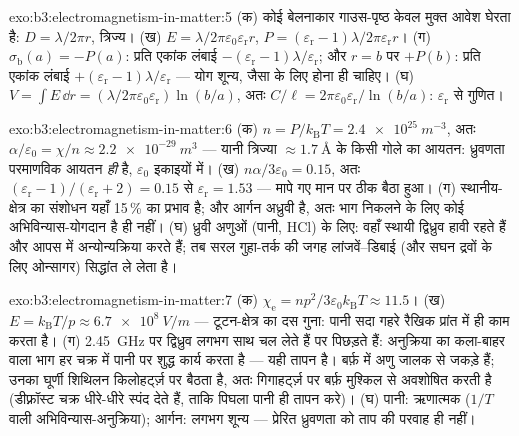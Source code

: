 \begin{solution}{exo:b3:electromagnetism-in-matter:5}
(क) कोई बेलनाकार गाउस-पृष्ठ केवल मुक्त आवेश घेरता है:
$D = \lambda/2\pi r$, त्रिज्य। (ख) $E =
\lambda/2\pi\varepsilon_0\varepsilon_{\text{r}}r$, $P =
(\varepsilon_{\text{r}}-1)\lambda/2\pi\varepsilon_{\text{r}}r$।
(ग) $\sigma_{\text{b}}(a) = -P(a)$: प्रति एकांक लंबाई
$-(\varepsilon_{\text{r}}-1)\lambda/\varepsilon_{\text{r}}$;
और $r = b$ पर $+P(b)$: प्रति एकांक लंबाई
$+(\varepsilon_{\text{r}}-1)\lambda/\varepsilon_{\text{r}}$ ---
योग शून्य, जैसा  के लिए होना ही चाहिए। (घ) $V = \int E\,\dd r =
(\lambda/2\pi\varepsilon_0\varepsilon_{\text{r}})\ln(b/a)$, अतः
$C/\ell = 2\pi\varepsilon_0\varepsilon_{\text{r}}/\ln(b/a)$:
$\varepsilon_{\text{r}}$ से गुणित।
\end{solution}

\begin{solution}{exo:b3:electromagnetism-in-matter:6}
(क) $n = P/k_{\text{B}}T = \qty{2.4e25}{m^{-3}}$, अतः
$\alpha/\varepsilon_0 = \chi/n \approx \qty{2.2e-29}{m^3}$ ---
यानी त्रिज्या $\approx\qty{1.7}{\angstrom}$ के किसी गोले का आयतन:
ध्रुवणता परमाणविक आयतन \emph{ही} है, $\varepsilon_0$ इकाइयों में।
(ख) $n\alpha/3\varepsilon_0 = 0.15$, अतः $(\varepsilon_{\text{r}} -
1)/(\varepsilon_{\text{r}} + 2) = 0.15$ से
$\varepsilon_{\text{r}} = 1.53$ --- मापे गए मान पर ठीक बैठा हुआ।
(ग) स्थानीय-क्षेत्र का संशोधन यहाँ 15\,\% का प्रभाव है; और आर्गन
अध्रुवी है, अतः भाग निकलने के लिए कोई अभिविन्यास-योगदान है ही नहीं। (घ)
ध्रुवी अणुओं (पानी, HCl) के लिए: वहाँ स्थायी द्विध्रुव हावी रहते हैं
और आपस में अन्योन्यक्रिया करते हैं; तब सरल गुहा-तर्क की जगह
लांजवें--डिबाई (और सघन द्रवों के लिए ओन्सागर) सिद्धांत ले लेता है।
\end{solution}

\begin{solution}{exo:b3:electromagnetism-in-matter:7}
(क) $\chi_{\text{e}} = np^2/3\varepsilon_0k_{\text{B}}T \approx
11.5$। (ख) $E = k_{\text{B}}T/p \approx \qty{6.7e8}{V/m}$ ---
टूटन-क्षेत्र का दस गुना: पानी सदा गहरे रैखिक प्रांत में ही काम करता
है। (ग) \qty{2.45}{GHz} पर द्विध्रुव लगभग साथ चल लेते हैं
पर पिछड़ते हैं: अनुक्रिया का कला-बाहर वाला भाग हर चक्र में पानी पर
शुद्ध कार्य करता है --- यही  तापन है। बर्फ़ में अणु
जालक से जकड़े हैं; उनका घूर्णी शिथिलन किलोहर्ट्ज़ पर बैठता है, अतः
गिगाहर्ट्ज़ पर बर्फ़ मुश्किल से अवशोषित करती है (डीफ़्रॉस्ट चक्र
धीरे-धीरे स्पंद देते हैं, ताकि पिघला पानी ही तापन करे)। (घ) पानी:
ऋणात्मक ($1/T$ वाली अभिविन्यास-अनुक्रिया); आर्गन: लगभग शून्य ---
प्रेरित ध्रुवणता को ताप की परवाह ही नहीं।
\end{solution}

